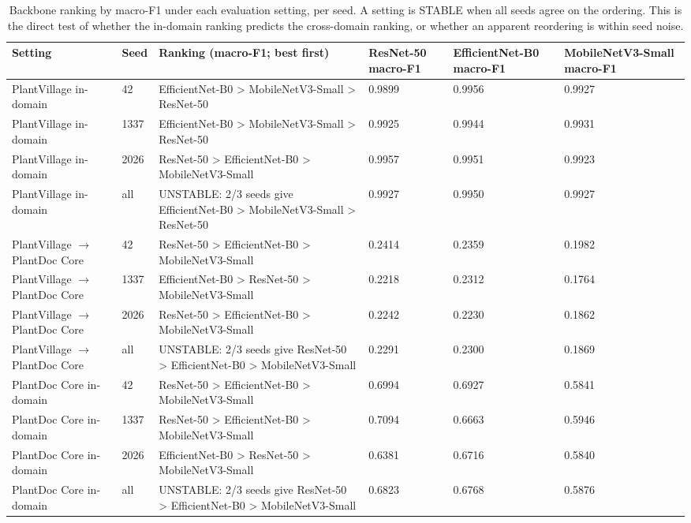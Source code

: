 \begin{table}
\caption{Backbone ranking by macro-F1 under each evaluation setting, per seed. A setting is STABLE when all seeds agree on the ordering. This is the direct test of whether the in-domain ranking predicts the cross-domain ranking, or whether an apparent reordering is within seed noise.}
\label{tab:ranking-stability}
\scriptsize
\centering
\begin{tabular}{llllll}
\toprule
Setting & Seed & Ranking (macro-F1; best first) & ResNet-50 macro-F1 & EfficientNet-B0 macro-F1 & MobileNetV3-Small macro-F1 \\
\midrule
PlantVillage in-domain & 42 & EfficientNet-B0 > MobileNetV3-Small > ResNet-50 & 0.9899 & 0.9956 & 0.9927 \\
PlantVillage in-domain & 1337 & EfficientNet-B0 > MobileNetV3-Small > ResNet-50 & 0.9925 & 0.9944 & 0.9931 \\
PlantVillage in-domain & 2026 & ResNet-50 > EfficientNet-B0 > MobileNetV3-Small & 0.9957 & 0.9951 & 0.9923 \\
PlantVillage in-domain & all & UNSTABLE: 2/3 seeds give EfficientNet-B0 > MobileNetV3-Small > ResNet-50 & 0.9927 & 0.9950 & 0.9927 \\
PlantVillage $\rightarrow$ PlantDoc Core & 42 & ResNet-50 > EfficientNet-B0 > MobileNetV3-Small & 0.2414 & 0.2359 & 0.1982 \\
PlantVillage $\rightarrow$ PlantDoc Core & 1337 & EfficientNet-B0 > ResNet-50 > MobileNetV3-Small & 0.2218 & 0.2312 & 0.1764 \\
PlantVillage $\rightarrow$ PlantDoc Core & 2026 & ResNet-50 > EfficientNet-B0 > MobileNetV3-Small & 0.2242 & 0.2230 & 0.1862 \\
PlantVillage $\rightarrow$ PlantDoc Core & all & UNSTABLE: 2/3 seeds give ResNet-50 > EfficientNet-B0 > MobileNetV3-Small & 0.2291 & 0.2300 & 0.1869 \\
PlantDoc Core in-domain & 42 & ResNet-50 > EfficientNet-B0 > MobileNetV3-Small & 0.6994 & 0.6927 & 0.5841 \\
PlantDoc Core in-domain & 1337 & ResNet-50 > EfficientNet-B0 > MobileNetV3-Small & 0.7094 & 0.6663 & 0.5946 \\
PlantDoc Core in-domain & 2026 & EfficientNet-B0 > ResNet-50 > MobileNetV3-Small & 0.6381 & 0.6716 & 0.5840 \\
PlantDoc Core in-domain & all & UNSTABLE: 2/3 seeds give ResNet-50 > EfficientNet-B0 > MobileNetV3-Small & 0.6823 & 0.6768 & 0.5876 \\
\bottomrule
\end{tabular}
\end{table}
